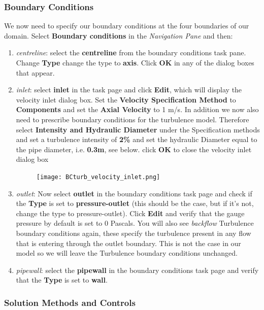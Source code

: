 \documentclass[11pt,a4paper,oneside]{scrartcl}
\newcommand\bfr[1]{\textcolor[rgb]{1,0.00,0.00}{\textbf{\textsf{#1}}}}
\begin{document}
\subsubsection{Boundary Conditions}

We now need to  specify our boundary conditions at the four boundaries of our domain. Select \bfr{Boundary conditions} in the \emph{Navigation Pane} and then:
\begin{enumerate}
\item \emph{centreline}: select the \bfr{centreline} from the boundary conditions task pane. Change \bfr{Type} change the type to \bfr{axis}. Click \bfr{OK} in any of the dialog boxes that appear.
\item \emph{inlet}: select \bfr{inlet} in the task page and click \bfr{Edit}, which will display the velocity inlet dialog box. Set the \bfr{Velocity Specification Method} to \bfr{Components} and set the \bfr{Axial Velocity} to 1 m/s. In addition we now also need to prescribe boundary conditions for the turbulence model. Therefore select \bfr{Intensity and Hydraulic Diameter} under the Specification methods and set a turbulence intensity of \bfr{2\%} and set the hydraulic Diameter equal to the pipe diameter, i.e. \bfr{0.3m}, see below. click \bfr{OK} to close the velocity inlet dialog box
    \begin{figure}[H]
    \begin{center}
    \texttt{[image: BCturb\_velocity\_inlet.png]}
    \end{center}
    \end{figure}
\item \emph{outlet}: Now select \bfr{outlet} in the boundary conditions task page and check if the \bfr{Type} is set to \bfr{pressure-outlet} (this should be the case, but if it's not, change the type to pressure-outlet). Click \bfr{Edit} and verify that the gauge pressure by default is set to 0 Pascals. You will also see \emph{backflow} Turbulence boundary conditions again, these specify the turbulence present in any flow that is entering through the outlet boundary. This is not the case in our model so we will leave the Turbulence boundary conditions unchanged.
\item \emph{pipewall}: select the \bfr{pipewall} in the boundary conditions task page and verify that the \bfr{Type} is set to \bfr{wall}.
\end{enumerate}

\subsubsection{Solution Methods and Controls}
\end{document}
